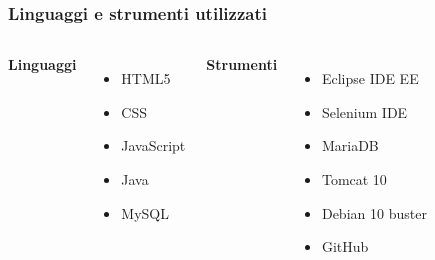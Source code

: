 \documentclass[12pt,a4paper]{beamer}
\begin{document}
\begin{frame}
\frametitle{Linguaggi e strumenti utilizzati}
\begin{columns}
\textbf{Linguaggi}
\begin{itemize}
\item HTML5
\item CSS
\item JavaScript
\item Java
\item MySQL
\end{itemize}
\textbf{Strumenti}
\begin{itemize}
\item Eclipse IDE EE
\item Selenium IDE
\item MariaDB
\item Tomcat 10
\item Debian 10 buster
\item GitHub
\end{itemize}
\end{columns}
\end{frame}

\begin{frame}

\end{frame}
\end{document}
